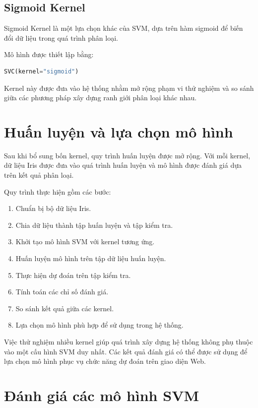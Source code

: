 \documentclass[12pt,a4paper]{report}
\begin{document}
	\subsection{Sigmoid Kernel}
	
	Sigmoid Kernel là một lựa chọn khác của SVM, dựa trên hàm sigmoid để biến đổi dữ liệu trong quá trình phân loại.
	
	\noindent
	Mô hình được thiết lập bằng:
	
	\begin{lstlisting}[language=Python]
		SVC(kernel="sigmoid")
	\end{lstlisting}
	
	Kernel này được đưa vào hệ thống nhằm mở rộng phạm vi thử nghiệm và so sánh giữa các phương pháp xây dựng ranh giới phân loại khác nhau.
	
	\section{Huấn luyện và lựa chọn mô hình}
	
	Sau khi bổ sung bốn kernel, quy trình huấn luyện được mở rộng. Với mỗi kernel, dữ liệu Iris được đưa vào quá trình huấn luyện và mô hình được đánh giá dựa trên kết quả phân loại.
	
	\noindent
	Quy trình thực hiện gồm các bước:
	
	\begin{enumerate}
		\item Chuẩn bị bộ dữ liệu Iris.
		\item Chia dữ liệu thành tập huấn luyện và tập kiểm tra.
		\item Khởi tạo mô hình SVM với kernel tương ứng.
		\item Huấn luyện mô hình trên tập dữ liệu huấn luyện.
		\item Thực hiện dự đoán trên tập kiểm tra.
		\item Tính toán các chỉ số đánh giá.
		\item So sánh kết quả giữa các kernel.
		\item Lựa chọn mô hình phù hợp để sử dụng trong hệ thống.
	\end{enumerate}
	
	Việc thử nghiệm nhiều kernel giúp quá trình xây dựng hệ thống không phụ thuộc vào một cấu hình SVM duy nhất. Các kết quả đánh giá có thể được sử dụng để lựa chọn mô hình phục vụ chức năng dự đoán trên giao diện Web.
	
	\section{Đánh giá các mô hình SVM}
	
\end{document}
